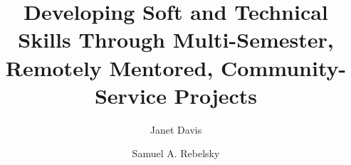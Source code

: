 \documentclass[sigconf]{acmart}
\begin{document}
\title[Multi-semester, remotely mentored, community service projects]{Developing Soft and Technical Skills Through Multi-Semester, Remotely Mentored, Community-Service Projects}

\author{Janet Davis}

\author{Samuel A. Rebelsky}







\maketitle

\newcommand{\college}{Grinnell}






\balance
 
\end{document}
